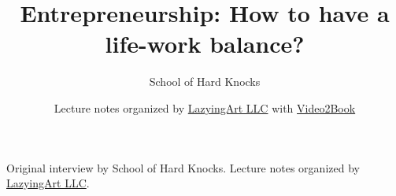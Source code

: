\documentclass[11pt,oneside]{book}
\begin{document}
\frontmatter
\title{Entrepreneurship: How to have a life-work balance?}
\author{School of Hard Knocks}
\date{Lecture notes organized by \href{https://lazying.art}{LazyingArt LLC} with \href{https://github.com/lachlanchen/Video2Book}{Video2Book}}
\maketitle
\begin{center}
\small Original interview by School of Hard Knocks. Lecture notes organized by \href{https://lazying.art}{LazyingArt LLC}.
\end{center}
\clearpage
\mainmatter

\end{document}
